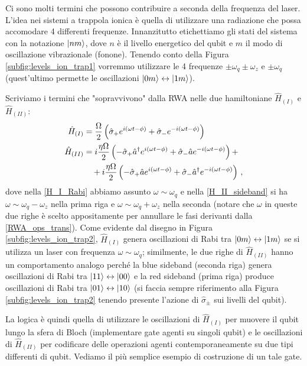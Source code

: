 \noindent Ci sono molti termini che possono contribuire a seconda della frequenza del laser. L'idea nei sistemi a trappola ionica è quella di utilizzare una radiazione che possa accomodare 4 differenti frequenze. Innanzitutto etichettiamo gli stati del sistema con la notazione $\ket{nm}$, dove $n$ è il livello energetico del qubit e $m$ il modo di oscillazione vibrazionale (fonone). Tenendo conto della Figura \ref{subfig:levels_ion_trap1} vorremmo utilizzare le 4 frequenze $\pm \omega_q \pm \omega_z$ e $\pm \omega_q$ (quest'ultimo permette le oscillazioni $\ket{0m} \leftrightarrow \ket{1m}$).

\noindent Scriviamo i termini che "sopravvivono" dalla RWA nelle due hamiltoniane $\hat{H}_{(I)}$ e $\hat{H}_{(II)}$:
\begin{align}
    \hat{H}_{(I)} &= \frac{\Omega}{2} \left( \hat{\sigma}_+ e^{i(\omega t - \phi)} + \hat{\sigma}_- e^{-i(\omega t - \phi)} \right) \label{H_I_Rabi} \\
    \hat{H}_{(II)} &= i \frac{\eta \Omega}{2} \left( -\hat{\sigma}_+ \hat{a}^\dag e^{i(\omega t - \phi)} + \hat{\sigma}_- \hat{a} e^{-i(\omega t - \phi)} \right) + \label{H_II_sideband} \\
    &\quad + i \frac{\eta \Omega}{2} \left( -\hat{\sigma}_+ \hat{a} e^{i(\omega t - \phi)} + \hat{\sigma}_- \hat{a}^\dag e^{-i(\omega t - \phi)} \right) \, , \notag
\end{align}
dove nella \eqref{H_I_Rabi} abbiamo assunto $\omega \sim \omega_q$ e nella \eqref{H_II_sideband} si ha $\omega \sim \omega_q - \omega_z$ nella prima riga e $\omega \sim \omega_q + \omega_z$ nella seconda (notare che $\omega$ in queste due righe è scelto appositamente per annullare le fasi derivanti dalla \eqref{RWA_ops_trans}). Come evidente dal disegno in Figura \ref{subfig:levels_ion_trap2}, $\hat{H}_{(I)}$ genera oscillazioni di Rabi tra $\ket{0 m} \leftrightarrow \ket{1m}$ se si utilizza un laser con frequenza $\omega \sim \omega_q$; similmente, le due righe di $\hat{H}_{(II)}$ hanno un comportamento analogo perché la blue sideband (seconda riga) genera oscillazioni di Rabi tra $\ket{11} \leftrightarrow \ket{00}$ e la red sideband (prima riga) produce oscillazioni di Rabi tra $\ket{01} \leftrightarrow \ket{10}$ (si faccia sempre riferimento alla Figura \ref{subfig:levels_ion_trap2} tenendo presente l'azione di $\hat{\sigma}_\pm$ sui livelli del qubit).  

\noindent La logica è quindi quella di utilizzare le oscillazioni di $\hat{H}_{(I)}$ per muovere il qubit lungo la sfera di Bloch (implementare gate agenti su singoli qubit) e le oscillazioni di $\hat{H}_{(II)}$ per codificare delle operazioni agenti contemporaneamente su due tipi differenti di qubit. Vediamo il più semplice esempio di costruzione di un tale gate.

